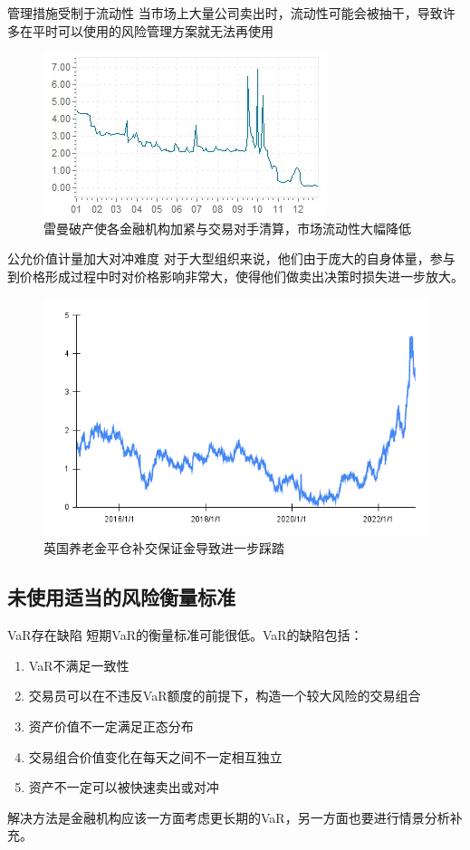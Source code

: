 \begin{frame}{管理措施受制于流动性}
    当市场上大量公司卖出时，流动性可能会被抽干，导致许多在平时可以使用的风险管理方案就无法再使用
    \begin{figure}[H]
        \includegraphics[width=0.6\linewidth]{img/libor2008.jpg}
        \caption{雷曼破产使各金融机构加紧与交易对手清算，市场流动性大幅降低}
        \label{fig:libor}
    \end{figure}
\end{frame}

\begin{frame}{公允价值计量加大对冲难度}
    对于大型组织来说，他们由于庞大的自身体量，参与到价格形成过程中时对价格影响非常大，使得他们做卖出决策时损失进一步放大。
    \begin{figure}[H]
        \includegraphics[width=0.6\linewidth]{img/british_bond.png}
        \caption{英国养老金平仓补交保证金导致进一步踩踏}
    \end{figure}
\end{frame}

\subsection{未使用适当的风险衡量标准}\label{sec:6}
\begin{frame}{VaR存在缺陷}
    短期VaR的衡量标准可能很低。VaR的缺陷包括：
\begin{enumerate}
    \item VaR不满足一致性
    \item 交易员可以在不违反VaR额度的前提下，构造一个较大风险的交易组合
    \item 资产价值不一定满足正态分布
    \item 交易组合价值变化在每天之间不一定相互独立
    \item 资产不一定可以被快速卖出或对冲
\end{enumerate}
解决方法是金融机构应该一方面考虑更长期的VaR，另一方面也要进行情景分析补充。
\end{frame}


